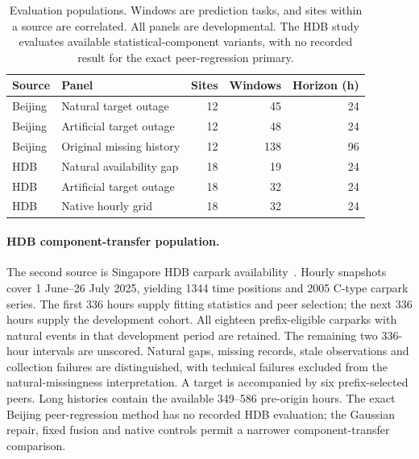 \begin{table}[t]
\caption{Evaluation populations. Windows are prediction tasks, and sites within a source are correlated. All panels are developmental. The HDB study evaluates available statistical-component variants, with no recorded result for the exact peer-regression primary.}
\label{tab:data}
\centering\small
\begin{tabular}{llrrr}
\toprule
Source & Panel & Sites & Windows & Horizon (h)\\
\midrule
Beijing & Natural target outage & 12 & 45 & 24\\
Beijing & Artificial target outage & 12 & 48 & 24\\
Beijing & Original missing history & 12 & 138 & 96\\
HDB & Natural availability gap & 18 & 19 & 24\\
HDB & Artificial target outage & 18 & 32 & 24\\
HDB & Native hourly grid & 18 & 32 & 24\\
\bottomrule
\end{tabular}
\end{table}

\paragraph{HDB component-transfer population.}
The second source is Singapore HDB carpark availability~\citep{hdbavailability}. Hourly snapshots cover 1 June--26 July 2025, yielding 1344 time positions and 2005 C-type carpark series. The first 336 hours supply fitting statistics and peer selection; the next 336 hours supply the development cohort. All eighteen prefix-eligible carparks with natural events in that development period are retained. The remaining two 336-hour intervals are unscored. Natural gaps, missing records, stale observations and collection failures are distinguished, with technical failures excluded from the natural-missingness interpretation. A target is accompanied by six prefix-selected peers. Long histories contain the available 349--586 pre-origin hours. The exact Beijing peer-regression method has no recorded HDB evaluation; the Gaussian repair, fixed fusion and native controls permit a narrower component-transfer comparison.

